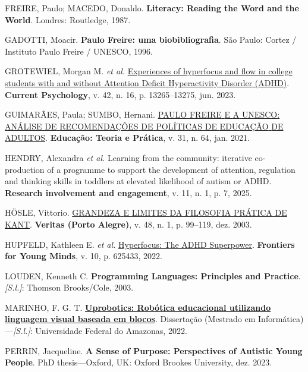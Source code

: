 \documentclass[
  12pt,
  a4paper,
]{article}
\newlength{\cslhangindent}
\newenvironment{CSLReferences}[2] %
 {\begin{list}{}{%
  \setlength{\itemindent}{0pt}
  \setlength{\leftmargin}{0pt}
  \setlength{\parsep}{0pt}
  \ifodd #1
   \setlength{\leftmargin}{\cslhangindent}
   \setlength{\itemindent}{-1\cslhangindent}
  \fi
  \setlength{\itemsep}{#2\baselineskip}}}
 {\end{list}}
\begin{document}
\begin{CSLReferences}{0}{1}
FREIRE, Paulo; MACEDO, Donaldo. \textbf{Literacy: Reading the Word and
the World}. Londres: Routledge, 1987.

GADOTTI, Moacir. \textbf{Paulo Freire: uma biobibliografia}. São Paulo:
Cortez / Instituto Paulo Freire / UNESCO, 1996.

GROTEWIEL, Morgan M. \emph{et al.}
\href{https://doi.org/10.1007/s12144-021-02539-0}{Experiences of
hyperfocus and flow in college students with and without {Attention}
{Deficit} {Hyperactivity} {Disorder} ({ADHD})}. \textbf{Current
Psychology}, v. 42, n. 16, p. 13265--13275, jun. 2023.

GUIMARÃES, Paula; SUMBO, Hernani.
\href{https://doi.org/10.18675/1981-8106.v31.n.64.s16188}{{PAULO}
{FREIRE} {E} {A} {UNESCO}: {ANÁLISE} {DE} {RECOMENDAÇÕES} {DE}
{POLÍTICAS} {DE} {EDUCAÇÃO} {DE} {ADULTOS}}. \textbf{Educação: Teoria e
Prática}, v. 31, n. 64, jan. 2021.

HENDRY, Alexandra \emph{et al.} Learning from the community: iterative
co-production of a programme to support the development of attention,
regulation and thinking skills in toddlers at elevated likelihood of
autism or {ADHD}. \textbf{Research involvement and engagement}, v. 11,
n. 1, p. 7, 2025.

HÖSLE, Vittorio.
\href{https://doi.org/10.15448/1984-6746.2003.1.34779}{{GRANDEZA} {E}
{LIMITES} {DA} {FILOSOFIA} {PRÁTICA} {DE} {KANT}}. \textbf{Veritas
(Porto Alegre)}, v. 48, n. 1, p. 99--119, dez. 2003.

HUPFELD, Kathleen E. \emph{et al.}
\href{https://doi.org/10.3389/frym.2021.625433}{Hyperfocus: The ADHD
Superpower}. \textbf{Frontiers for Young Minds}, v. 10, p. 625433, 2022.

LOUDEN, Kenneth C. \textbf{Programming Languages: Principles and
Practice}. \emph{{[}S.l.{]}}: Thomson Brooks/Cole, 2003.

MARINHO, F. G. T.
\textbf{\href{https://tede.ufam.edu.br/handle/tede/8809}{Uprobotics:
Robótica educacional utilizando linguagem visual baseada em blocos}}.
Dissertação (Mestrado em Informática)---\emph{{[}S.l.{]}}: Universidade
Federal do Amazonas, 2022.

PERRIN, Jacqueline. \textbf{A {Sense} of {Purpose}: {Perspectives} of
{Autistic} {Young} {People}}. PhD thesis---Oxford, UK: Oxford Brookes
University, dez. 2023.


\end{CSLReferences}
\end{document}
